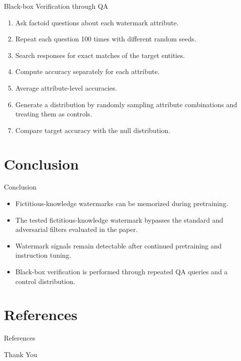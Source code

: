 \documentclass[xcolor=dvipsnames,aspectratio=169]{beamer}
\begin{document}
	\begin{frame}{Black-box Verification through QA}
		\begin{enumerate}
			\item Ask factoid questions about each watermark attribute.
			\item Repeat each question 100 times with different random seeds.
			\item Search responses for exact matches of the target entities.
			\item Compute accuracy separately for each attribute.
			\item Average attribute-level accuracies.
			\item Generate a distribution by randomly sampling attribute combinations and treating them as controls.
			\item Compare target accuracy with the null distribution.
		\end{enumerate}
	\end{frame}
	
	\section{Conclusion}
	
	\begin{frame}{Conclusion}
		\begin{itemize}
			\item Fictitious-knowledge watermarks can be memorized during pretraining.
			\item The tested fictitious-knowledge watermark bypasses the standard and adversarial filters evaluated in the paper.
			\item Watermark signals remain detectable after continued pretraining and instruction tuning.
			\item Black-box verification is performed through repeated QA queries and a control distribution.
		\end{itemize}
	\end{frame}
	
	
	\section{References}
	\begin{frame}{References}
		\tiny
		
		\nocite{*} 
	\end{frame}
	
	\begin{frame}
		\begin{center}
			{\Huge\calligra Thank You}
		\end{center}
	\end{frame}
	
\end{document}
